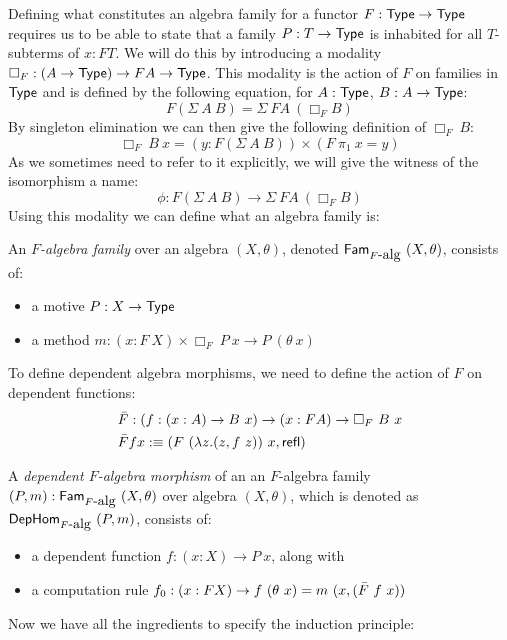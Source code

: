 \documentclass[a4paper,10pt]{report}
\begin{document}
Defining what constitutes an algebra family for a functor
$F : \mathsf{Type} \to \mathsf{Type}$ requires us to be able to state that a family
$P : T \to \mathsf{Type}$ is inhabited for all $T$-subterms of $x : FT$. We
will do this by introducing a modality
$\Box_F : (A \to \mathsf{Type}) \to FA \to \mathsf{Type}$. This modality is the action
of $F$ on families in $\mathsf{Type}$ and is defined by the following
equation, for $A : \mathsf{Type}$, $B : A \to \mathsf{Type}$:
$$
F (\Sigma\ A\ B) = \Sigma\ FA\ (\Box_{F} B)
$$
By singleton elimination we can then give the following definition of $\Box_{F}\ B$:
$$
\Box_{F}\ B\ x = (y : F (\Sigma\ A\ B)) \times (F\ \pi_1\ x = y)
$$
As we sometimes need to refer to it explicitly, we will give the
witness of the isomorphism a name:
$$
\phi : F (\Sigma\ A\ B) \to \Sigma\ FA\ (\Box_{F} B)
$$
Using this modality we can define what an algebra family is:
%
\begin{defn}
  An \emph{$F$-algebra family} over an algebra $(X,\theta)$, denoted
  $\mathsf{Fam}_{F\mbox{-alg}}\ (X,\theta)$, consists of:

  \begin{itemize}
  \item a motive $P : X \to \mathsf{Type}$
  \item a method $m : (x : F\ X) \times \Box_F\ P\ x \to P\ (\theta\ x)$
  \end{itemize}
\end{defn}
%
To define dependent algebra morphisms, we need to define the action of
$F$ on dependent functions:
%
\begin{align*}
&\actionsection{F} : (f : (x : A) \to B\ x) \to (x : FA) \to \Box_F\ B\ x \\
&\actionsection{F} f x \ddefeq (F\ (\lambda z . (z , f\ z))\ x, \refl)
\end{align*}
%
\begin{defn}
  A \emph{dependent $F$-algebra morphism} of an an $F$-algebra family
  $(P,m) : \mathsf{Fam}_{F\mbox{-alg}}\ (X,\theta)$ over algebra
  $(X,\theta)$, which is denoted as $\mathsf{DepHom}_{F\mbox{-alg}}\ (P,m)$,
  consists of:

  \begin{itemize}
  \item a dependent function $f : (x : X) \to P\ x$, along with
  \item a computation rule $f_0 : (x : FX) \to f\ (\theta\ x) = m\ (x, (\bar{F}\ f\ x))$
  \end{itemize}
\end{defn}

Now we have all the ingredients to specify the induction principle:
\end{document}
